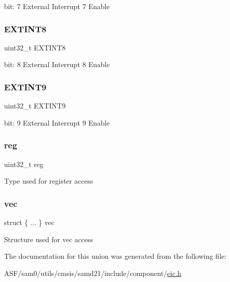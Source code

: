 bit\+: 7 External Interrupt 7 Enable \mbox{\label{union_e_i_c___i_n_t_e_n_c_l_r___type_aab9d762f86dec3f39445ee2ad1c41196}} 
\subsubsection{\texorpdfstring{EXTINT8}{EXTINT8}}
{\footnotesize\ttfamily uint32\+\_\+t E\+X\+T\+I\+N\+T8}

bit\+: 8 External Interrupt 8 Enable \mbox{\label{union_e_i_c___i_n_t_e_n_c_l_r___type_abd6774c81c28d04fbef1daa87929c1d3}} 
\subsubsection{\texorpdfstring{EXTINT9}{EXTINT9}}
{\footnotesize\ttfamily uint32\+\_\+t E\+X\+T\+I\+N\+T9}

bit\+: 9 External Interrupt 9 Enable \mbox{\label{union_e_i_c___i_n_t_e_n_c_l_r___type_a6b91636401516a477989a336376d7b40}} 
\subsubsection{\texorpdfstring{reg}{reg}}
{\footnotesize\ttfamily uint32\+\_\+t reg}

Type used for register access \mbox{\label{union_e_i_c___i_n_t_e_n_c_l_r___type_a573b2fa080a312d8a3a669d6e1a5af45}} 
\subsubsection{\texorpdfstring{vec}{vec}}
{\footnotesize\ttfamily struct \{ ... \}   vec}

Structure used for vec access 

The documentation for this union was generated from the following file\+:\begin{DoxyCompactItemize}
\item 
A\+S\+F/sam0/utils/cmsis/samd21/include/component/\mbox{\hyperlink{component_2eic_8h}{eic.\+h}}\end{DoxyCompactItemize}
